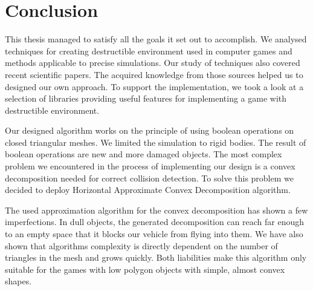 \chapter*{Conclusion}

This thesis managed to satisfy all the goals it set out to accomplish. We analysed techniques for creating destructible environment used in computer games and methods applicable to precise simulations. Our study of techniques also covered recent scientific papers. The acquired knowledge from those sources helped us to designed our own approach. To support the implementation, we took a look at a selection of libraries providing useful features for  implementing a game with destructible environment.

Our designed algorithm works on the principle of using boolean operations on closed triangular meshes. We limited the simulation to rigid bodies. The result of boolean operations are new and more damaged objects. The most complex problem we encountered in the process of implementing our design is a convex decomposition needed for correct collision detection. To solve this problem we decided to deploy Horizontal Approximate Convex Decomposition algorithm.

The used approximation algorithm for the convex decomposition has shown a few imperfections. In dull objects, the generated decomposition can reach far enough to an empty space that it blocks our vehicle from flying into them. We have also shown that algorithms complexity is directly dependent on the number of triangles in the mesh and grows quickly. Both liabilities make this algorithm only suitable for the games with low polygon objects with simple, almost convex shapes.

